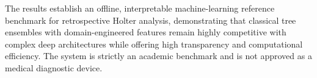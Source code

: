 \documentclass[conference]{IEEEtran}
\begin{document}
The results establish an offline, interpretable machine-learning reference benchmark for retrospective Holter analysis, demonstrating that classical tree ensembles with domain-engineered features remain highly competitive with complex deep architectures while offering high transparency and computational efficiency. The system is strictly an academic benchmark and is not approved as a medical diagnostic device.



\end{document}
